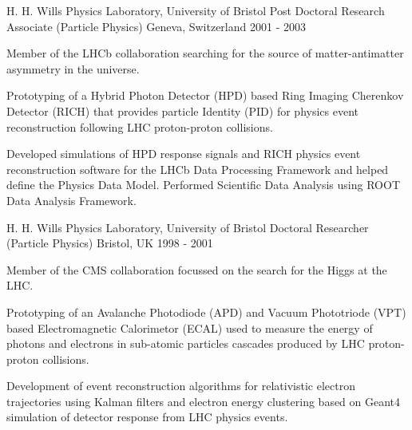 \begin{cventries}
\cventry
{H. H. Wills Physics Laboratory, University of Bristol} %
{Post Doctoral Research Associate (Particle Physics)} %
{Geneva, Switzerland} %
{2001 - 2003} %
{
  \begin{cvitems} %
    \item {
      Member of the LHCb collaboration searching for the source of matter-antimatter 
      asymmetry in the universe.} 
    \item {
      Prototyping of a Hybrid Photon Detector (HPD) based Ring Imaging Cherenkov 
      Detector (RICH) that provides particle Identity (PID) for physics event 
      reconstruction following LHC proton-proton collisions.}
    \item {
      Developed simulations of HPD response signals and RICH physics event 
      reconstruction software for the LHCb Data Processing Framework and helped 
      define the Physics Data Model. Performed Scientific Data Analysis using 
      ROOT Data Analysis Framework.
        }
  \end{cvitems}
}

\cventry
{H. H. Wills Physics Laboratory, University of Bristol} %
{Doctoral Researcher (Particle Physics)} %
{Bristol, UK} %
{1998 - 2001} %
{
  \begin{cvitems} %
    \item {
      Member of the CMS collaboration focussed on the search for the Higgs at the LHC.}
    \item {
      Prototyping of an Avalanche Photodiode (APD) and Vacuum Phototriode (VPT) 
      based Electromagnetic Calorimetor (ECAL) used to measure the energy 
      of photons and electrons in sub-atomic particles cascades produced by 
      LHC proton-proton collisions.}
    \item {
      Development of event reconstruction algorithms for relativistic electron trajectories 
      using Kalman filters and electron energy clustering based on Geant4 simulation 
      of detector response from LHC physics events.}
  \end{cvitems}
}

\end{cventries}